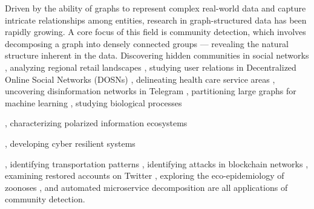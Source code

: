 Driven by the ability of graphs to represent complex real-world data and capture intricate relationships among entities, research in graph-structured data has been rapidly growing. A core focus of this field is community detection, which involves decomposing a graph into densely connected groups --- revealing the natural structure inherent in the data. Discovering hidden communities in social networks \cite{blekanov2021detection}, analyzing regional retail landscapes \cite{verhetsel2022regional}, studying user relations in Decentralized Online Social Networks (DOSNs) \cite{la2022information}, delineating health care service areas \cite{wang2021network}, uncovering disinformation networks in Telegram \cite{la2021uncovering}, partitioning large graphs for machine learning \cite{bai2024leiden}, studying biological processes \cite{heumos2023best}, characterizing polarized information ecosystems \cite{uyheng2021mainstream}, developing cyber resilient systems \cite{chernikova2022cyber}, identifying transportation patterns \cite{chen2023deciphering}, identifying attacks in blockchain networks \cite{erfan2023community}, examining restored accounts on Twitter \cite{kapoor2021ll}, exploring the eco-epidemiology of zoonoses \cite{desvars2024one}, and automated microservice decomposition \cite{cao2022implementation} are all applications of community detection.

